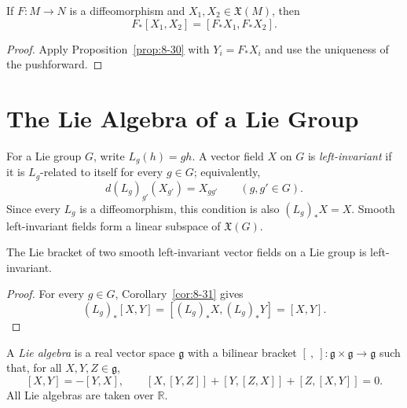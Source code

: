 \begin{corollary}
\label{cor:8-31}





If $F\colon M\to N$ is a diffeomorphism and
$X_1,X_2\in\mathfrak{X}(M)$, then
\[
F_*[X_1,X_2]=[F_*X_1,F_*X_2].
\]
\end{corollary}

\begin{proof}

\sketch Apply Proposition~\ref{prop:8-30} with $Y_i=F_*X_i$ and use the
uniqueness of the pushforward.
\end{proof}

\section{The Lie Algebra of a Lie Group}

\begin{definition}
\label{def:8-60-extra-1}




For a Lie group $G$, write $L_g(h)=gh$. A vector field $X$ on $G$ is
\emph{left-invariant} if it is $L_g$-related to itself for every $g\in G$;
equivalently,
\[
d(L_g)_{g'}(X_{g'})=X_{gg'}
\qquad(g,g'\in G). \tag{8.12}
\]
Since every $L_g$ is a diffeomorphism, this condition is also
$(L_g)_*X=X$. Smooth left-invariant fields form a linear subspace of
$\mathfrak{X}(G)$.
\end{definition}

\begin{proposition}
\label{prop:8-33}





The Lie bracket of two smooth left-invariant vector fields on a Lie group is
left-invariant.
\end{proposition}

\begin{proof}

\sketch For every $g\in G$, Corollary~\ref{cor:8-31} gives
\[
(L_g)_*[X,Y]=[(L_g)_*X,(L_g)_*Y]=[X,Y].
\]
\end{proof}

\begin{definition}
\label{def:8-60-extra-2}



A \emph{Lie algebra} is a real vector space $\mathfrak g$ with a bilinear
bracket $[\ ,\ ]\colon\mathfrak g\times\mathfrak g\to\mathfrak g$ such that,
for all $X,Y,Z\in\mathfrak g$,
\[
[X,Y]=-[Y,X],
\qquad
[X,[Y,Z]]+[Y,[Z,X]]+[Z,[X,Y]]=0.
\]
All Lie algebras are taken over $\mathbb{R}$.
\end{definition}

